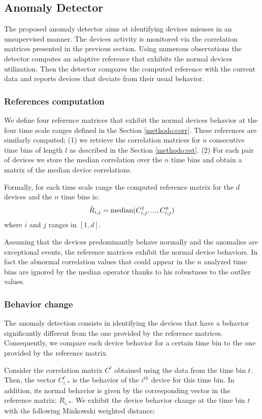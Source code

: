 \subsection{Anomaly Detector}\label{methodo:ano}
The proposed anomaly detector aims at identifying devices misuses in an unsupervised manner.
The devices activity is monitored via the correlation matrices presented in the previous section.
Using numerous observations the detector computes an adaptive reference that exhibits the normal devices utilization.
Then the detector compares the computed reference with the current data and reports devices that deviate from their usual behavior.

\subsubsection{References computation}
We define four reference matrices that exhibit the normal devices behavior at the four time scale ranges defined in the Section \ref{methodo:corr}.
These references are similarly computed; (1) we retrieve the correlation matrices for $n$ consecutive time bins of length $l$ as described in the Section \ref{methodo:est}. (2) For each pair of devices we store the median correlation over the $n$ time bins and obtain a matrix of the median device correlations.

Formally, for each time scale range the computed reference matrix for the $d$ devices and the $n$ time bins is:
\[\tilde{R}_{i,j} =  \operatorname{median}(C^1_{i,j},...,C^n_{i,j})\]
where $i$ and $j$ ranges in $[1,d]$.

Assuming that the devices predominantly behave normally and the anomalies are exceptional events, the reference matrices exhibit the normal device behaviors.
In fact the abnormal correlation values that could appear in the $n$ analyzed time bins are ignored by the median operator thanks to his robustness to the outlier values.

\subsubsection{Behavior change}
The anomaly detection consists in identifying the devices that have a behavior significantly different from the one provided by the reference matrices.
Consequently, we compare each device behavior for a certain time bin to the one provided by the reference matrix.

Consider the correlation matrix $C^t$ obtained using the data from the time bin $t$.
Then, the vector $C^t_{i,*}$ is the behavior of the $i^{th}$ device for this time bin.
In addition, its normal behavior is given by the corresponding vector in the reference matrix; $R_{i,*}$.
We exhibit the device behavior change at the time bin $t$ with the following Minkowski weighted distance;

